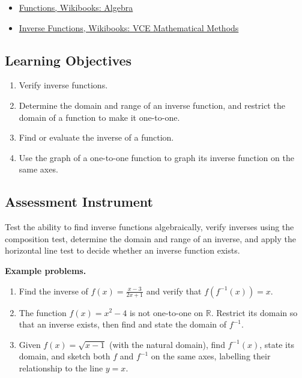 \begin{itemize}
  \item \href{https://en.wikibooks.org/wiki/Algebra/Functions}{Functions, Wikibooks: Algebra}
  \item \href{https://en.wikibooks.org/wiki/VCE_Mathematical_Methods/Inverse_functions}{Inverse Functions, Wikibooks: VCE Mathematical Methods}
\end{itemize}

\subsection{Learning Objectives}
\label{ssec:lear-fe6e}

\begin{enumerate}
    \item Verify inverse functions.
    \item Determine the domain and range of an inverse function, and restrict the domain of a function to make it one-to-one.
    \item Find or evaluate the inverse of a function.
    \item Use the graph of a one-to-one function to graph its inverse function on the same axes.
\end{enumerate}

\subsection{Assessment Instrument}
\label{ssec:asse-3669}

Test the ability to find inverse functions algebraically, verify inverses using the
composition test, determine the domain and range of an inverse, and apply the horizontal
line test to decide whether an inverse function exists.

\textbf{Example problems.}
\begin{enumerate}
    \item Find the inverse of $f(x) = \frac{x - 3}{2x + 1}$ and verify that $f(f^{-1}(x)) = x$.
    \item The function $f(x) = x^{2} - 4$ is not one-to-one on $\mathbb{R}$. Restrict its domain so that an inverse exists, then find and state the domain of $f^{-1}$.
    \item Given $f(x) = \sqrt{x - 1}$ (with the natural domain), find $f^{-1}(x)$, state its domain, and sketch both $f$ and $f^{-1}$ on the same axes, labelling their relationship to the line $y = x$.
\end{enumerate}

